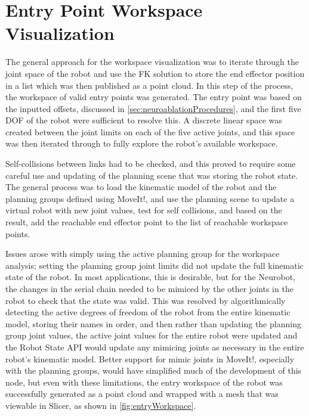 \documentclass[12pt]{report}
\begin{document}
\section{Entry Point Workspace Visualization}
The general approach for the workspace visualization was to iterate through the joint space of the robot and use the FK solution to store the end effector position in a list which was then published as a point cloud. In this step of the process, the workspace of valid entry points was generated. The entry point was based on the inputted offsets, discussed in \autoref{sec:neuroablationProcedures}, and the first five DOF of the robot were sufficient to resolve this. A discrete linear space was created between the joint limits on each of the five active joints, and this space was then iterated through to fully explore the robot's available workspace. 

Self-collisions between links had to be checked, and this proved to require some careful use and updating of the planning scene that was storing the robot state. The general process was to load the kinematic model of the robot and the planning groups defined using MoveIt!, and use the planning scene to update a virtual robot with new joint values, test for self collisions, and based on the result, add the reachable end effector point to the list of reachable workspace points.

Issues arose with simply using the active planning group for the workspace analysis; setting the planning group joint limits did not update the full kinematic state of the robot. In most applications, this is desirable, but for the Neurobot, the changes in the serial chain needed to be mimiced by the other joints in the robot to check that the state was valid. This was resolved by algorithmically detecting the active degrees of freedom of the robot from the entire kinematic model, storing their names in order, and then rather than updating the planning group joint values, the active joint values for the entire robot were updated and the Robot State API would update any mimicing joints as necessary in the entire robot's kinematic model. Better support for mimic joints in MoveIt!, especially with the planning groups, would have simplified much of the development of this node, but even with these limitations, the entry workspace of the robot was successfully generated as a point cloud and wrapped with a mesh that was viewable in Slicer, as shown in \autoref{fig:entryWorkspace}.
\end{document}
